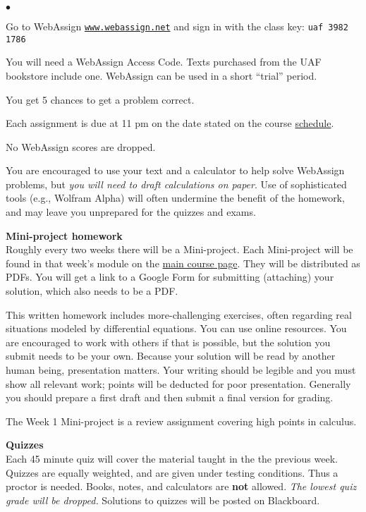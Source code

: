 \documentclass[12pt]{article}
\renewcommand{\emph}[1]{\textsf{\textbf{#1}}}
\newcommand{\localhead}[1]{\par\smallskip\textbf{#1}\nobreak\\}%
\def\subheading#1{\localhead{\emph{#1}}}
\newenvironment{clist}%
{\bgroup\parskip 0pt\begin{list}{$\bullet$}{\partopsep 4pt\topsep 0pt\itemsep -2pt}}%
{\end{list}\egroup}%
\begin{document}
\begin{clist}
\item Go to WebAssign \href{https://www.webassign.net/}{\tt www.webassign.net} and sign in with the class key: \quad \texttt{uaf 3982 1786}
\item You will need a WebAssign Access Code.  Texts purchased from the UAF bookstore include one.  WebAssign can be used in a short ``trial'' period.
\item You get 5 chances to get a problem correct. 
\item Each assignment is due at 11 pm on the date stated on the course \href{https://bueler.github.io/math302/schedule.pdf}{schedule}. 
\item No WebAssign scores are dropped.
\end{clist}

You are encouraged to use your text and a calculator to help solve WebAssign problems, but \textsl{you will need to draft calculations on paper}.  Use of sophisticated tools (e.g., Wolfram Alpha) will often undermine the benefit of the homework, and may leave you unprepared for the quizzes and exams.

\subheading{Mini-project homework}
Roughly every two weeks there will be a Mini-project.  Each Mini-project will be found in that week's module on the \href{https://bueler.github.io/math302/}{main course page}.  They will be distributed as PDFs.  You will get a link to a Google Form for submitting (attaching) your solution, which also needs to be a PDF.

This written homework includes more-challenging exercises, often regarding real situations modeled by differential equations.  You can use online resources.  You are encouraged to work with others if that is possible, but the solution you submit needs to be your own.  Because your solution will be read by another human being, presentation matters.  Your writing should be legible and you must show all relevant work; points will be deducted for poor presentation.  Generally you should prepare a first draft and then submit a final version for grading.

The Week 1 Mini-project is a review assignment covering high points in calculus.

\subheading{Quizzes}
Each 45 minute quiz will cover the material taught in the the previous week.  Quizzes are equally weighted, and are given under testing conditions.  Thus a proctor is needed.  Books, notes, and calculators are \emph{not} allowed.  \textsl{The lowest quiz grade will be dropped.}  Solutions to quizzes will be posted on Blackboard.
\end{document}
